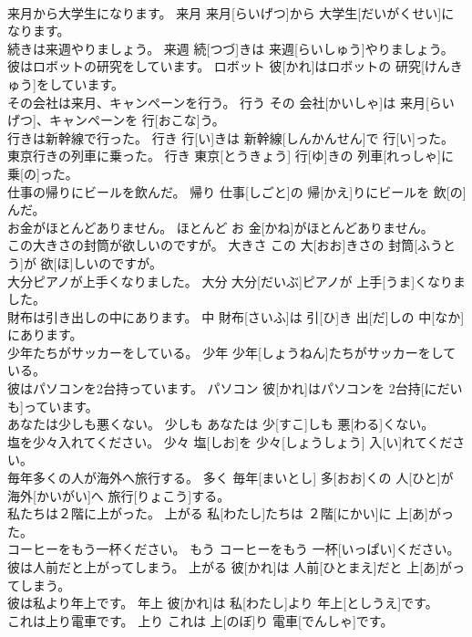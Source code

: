 \documentclass[8pt]{extreport}
\begin{document}
\begin{CJK}{UTF8}{min}
\\	来月から大学生になります。	来月	来月[らいげつ]から 大学生[だいがくせい]になります。	
\\	続きは来週やりましょう。	来週	続[つづ]きは 来週[らいしゅう]やりましょう。	
\\	彼はロボットの研究をしています。	ロボット	彼[かれ]はロボットの 研究[けんきゅう]をしています。	
\\	その会社は来月、キャンペーンを行う。	行う	その 会社[かいしゃ]は 来月[らいげつ]、キャンペーンを 行[おこな]う。	
\\	行きは新幹線で行った。	行き	行[い]きは 新幹線[しんかんせん]で 行[い]った。	
\\	東京行きの列車に乗った。	行き	東京[とうきょう] 行[ゆ]きの 列車[れっしゃ]に 乗[の]った。	
\\	仕事の帰りにビールを飲んだ。	帰り	仕事[しごと]の 帰[かえ]りにビールを 飲[の]んだ。	
\\	お金がほとんどありません。	ほとんど	お 金[かね]がほとんどありません。	
\\	この大きさの封筒が欲しいのですが。	大きさ	この 大[おお]きさの 封筒[ふうとう]が 欲[ほ]しいのですが。	
\\	大分ピアノが上手くなりました。	大分	大分[だいぶ]ピアノが 上手[うま]くなりました。	
\\	財布は引き出しの中にあります。	中	財布[さいふ]は 引[ひ]き 出[だ]しの 中[なか]にあります。	
\\	少年たちがサッカーをしている。	少年	少年[しょうねん]たちがサッカーをしている。	
\\	彼はパソコンを2台持っています。	パソコン	彼[かれ]はパソコンを 2台持[にだい も]っています。	
\\	あなたは少しも悪くない。	少しも	あなたは 少[すこ]しも 悪[わる]くない。	
\\	塩を少々入れてください。	少々	塩[しお]を 少々[しょうしょう] 入[い]れてください。	
\\	毎年多くの人が海外へ旅行する。	多く	毎年[まいとし] 多[おお]くの 人[ひと]が 海外[かいがい]へ 旅行[りょこう]する。	
\\	私たちは２階に上がった。	上がる	私[わたし]たちは ２階[にかい]に 上[あ]がった。	
\\	コーヒーをもう一杯ください。	もう	コーヒーをもう 一杯[いっぱい]ください。	
\\	彼は人前だと上がってしまう。	上がる	彼[かれ]は 人前[ひとまえ]だと 上[あ]がってしまう。	
\\	彼は私より年上です。	年上	彼[かれ]は 私[わたし]より 年上[としうえ]です。	
\\	これは上り電車です。	上り	これは 上[のぼ]り 電車[でんしゃ]です。	

\end{CJK}
\end{document}
